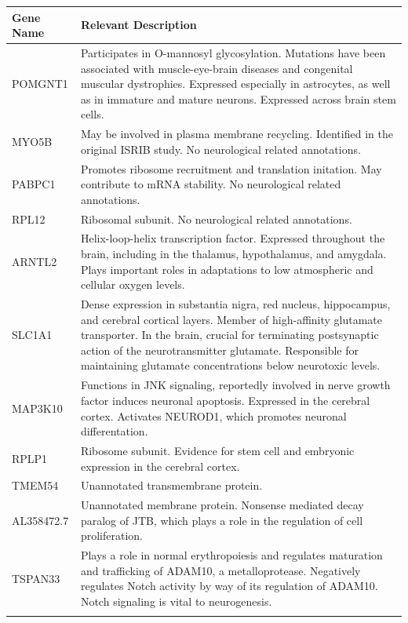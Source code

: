 \documentclass[11pt, a4paper, oneside]{article}
\begin{document}
\begin{tabular}{p{2.5cm}p{15.5cm}}
 \textbf{Gene Name} & \textbf{Relevant Description} \\
 \hline
 POMGNT1 & Participates in O-mannosyl glycosylation. Mutations have been associated with muscle-eye-brain diseases and congenital muscular dystrophies. Expressed especially in astrocytes, as well as in immature and mature neurons. Expressed across brain stem cells. \\
 \hline
 MYO5B & May be involved in plasma membrane recycling. Identified in the original ISRIB study. No neurological related annotations. \\
 \hline
 PABPC1 & Promotes ribosome recruitment and translation initation. May contribute to mRNA stability. No neurological related annotations. \\
 \hline
 RPL12 & Ribosomal subunit. No neurological related annotations. \\
 \hline
 ARNTL2 & Helix-loop-helix transcription factor. Expressed throughout the brain, including in the thalamus, hypothalamus, and amygdala. Plays important roles in adaptations to low atmospheric and cellular oxygen levels. \\
 \hline
 SLC1A1 & Dense expression in substantia nigra, red nucleus, hippocampus, and cerebral cortical layers. Member of high-affinity glutamate transporter. In the brain, crucial for terminating postsynaptic action of the neurotransmitter glutamate. Responsible for maintaining glutamate concentrations below neurotoxic levels. \\
 \hline
 MAP3K10 & Functions in JNK signaling, reportedly involved in nerve growth factor induces neuronal apoptosis. Expressed in the cerebral cortex. Activates NEUROD1, which promotes neuronal differentation. \\
 \hline
 RPLP1 & Ribosome subunit. Evidence for stem cell and embryonic expression in the cerebral cortex. \\
 \hline
 TMEM54 & Unannotated transmembrane protein. \\
 \hline
 AL358472.7 & Unannotated membrane protein. Nonsense mediated decay paralog of JTB, which plays a role in the regulation of cell proliferation. \\
 \hline
 TSPAN33 & Plays a role in normal erythropoiesis and regulates maturation and trafficking of ADAM10, a metalloprotease. Negatively regulates Notch activity by way of its regulation of ADAM10. Notch signaling is vital to neurogenesis. \\
 \label{tab:targets}
\end{tabular}
\newline
\end{document}
